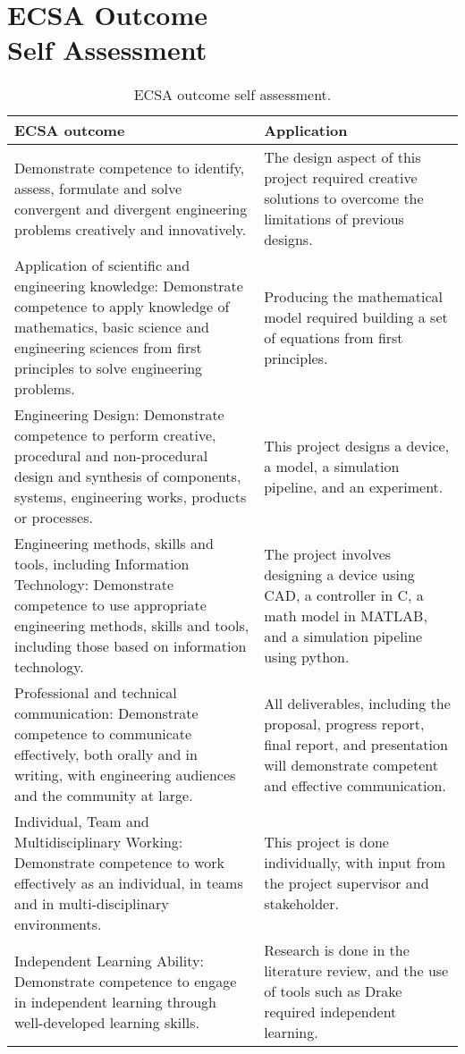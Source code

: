 \chapter{ECSA Outcome \\
	Self Assessment}

\begin{table}[h]
	\caption{ECSA outcome self assessment.}
	\footnotesize
	\begin{tabular}{ | p{22em} | p{17em} |} 
		\hline
		ECSA outcome& Application \\ 
		\hline
		Demonstrate competence to identify, assess, formulate and solve convergent and
		divergent engineering problems creatively and innovatively. & 
		The design aspect of this project required creative solutions to overcome the limitations of previous designs. \\ 
		\hline
		Application of scientific and engineering knowledge: Demonstrate competence to apply knowledge
		of mathematics, basic science and engineering sciences from first principles to solve engineering problems. & 
		Producing the mathematical model required building a set of equations from first principles. \\ 
		\hline
		Engineering Design: Demonstrate competence to perform creative, procedural and non-procedural design and synthesis of components, systems, engineering works, products or processes.& This project designs a device, a model, a simulation pipeline, and an experiment. \\ 
		\hline
		Engineering methods, skills and tools, including Information Technology: Demonstrate competence
		to use appropriate engineering methods, skills and tools, including those based on information technology. & 
		The project involves designing a device using CAD, a controller in C, a math model in MATLAB, and a simulation pipeline using python.\\ 
		\hline
		Professional and technical communication: Demonstrate competence to communicate effectively,
		both orally and in writing, with engineering audiences and the community at large. & 
		All deliverables, including the proposal, progress report, final report, and presentation will demonstrate competent and effective communication. \\ 
		\hline
		Individual, Team and Multidisciplinary Working: Demonstrate competence to work effectively as an
		individual, in teams and in multi-disciplinary environments. & 
		This project is done individually, with input from the project supervisor and stakeholder. \\ 
		\hline
		Independent Learning Ability: Demonstrate competence to engage in independent learning through
		well-developed learning skills. & 
		Research is done in the literature review, and the use of tools such as Drake required independent learning. \\ 
		\hline
	\end{tabular}
\end{table}